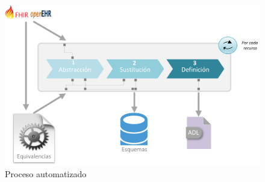 \begin{figure}
  \includegraphics[scale=0.5]{./images/solution}
  \caption{Proceso automatizado}
  \label{fig:solution}
\end{figure}






